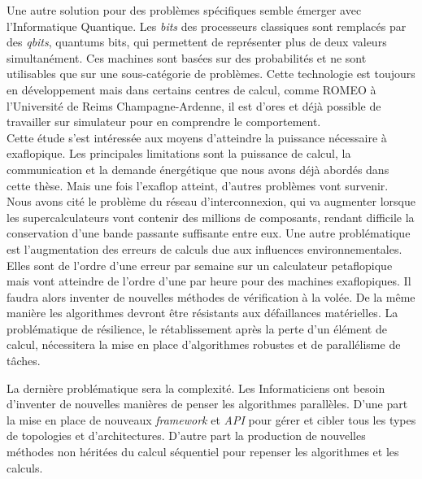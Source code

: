 \documentclass[12pt,a4paper]{report}
\begin{document}
Une autre solution pour des problèmes spécifiques semble émerger avec l'Informatique Quantique. 
Les \textit{bits} des processeurs classiques sont remplacés par des \textit{qbits}, quantums bits, qui permettent de représenter plus de deux valeurs simultanément.  
Ces machines sont basées sur des probabilités et ne sont utilisables que sur une sous-catégorie de problèmes. 
Cette technologie est toujours en développement mais dans certains centres de calcul, comme ROMEO à l'Université de Reims Champagne-Ardenne, il est d’ores et déjà possible de travailler sur simulateur pour en comprendre le comportement.\\

Cette étude s'est intéressée aux moyens d'atteindre la puissance nécessaire à exaflopique.
Les principales limitations sont la puissance de calcul, la communication et la demande énergétique que nous avons déjà abordés dans cette thèse. 
Mais une fois l'exaflop atteint, d'autres problèmes vont survenir. 
Nous avons cité le problème du réseau d'interconnexion, qui va augmenter lorsque les supercalculateurs vont contenir des millions de composants, rendant difficile la conservation d'une bande passante suffisante entre eux.
Une autre problématique est l'augmentation des erreurs de calculs due aux influences environnementales. 
Elles sont de l'ordre d'une erreur par semaine sur un calculateur petaflopique mais vont atteindre de l'ordre d'une par heure pour des machines exaflopiques. 
Il faudra alors inventer de nouvelles méthodes de vérification à la volée. 
De la même manière les algorithmes devront être résistants aux défaillances matérielles. 
La problématique de résilience, le rétablissement après la perte d'un élément de calcul, nécessitera la mise en place d'algorithmes robustes et de parallélisme de tâches. 

La dernière problématique sera la complexité. 
Les Informaticiens ont besoin d'inventer de nouvelles manières de penser les algorithmes parallèles. 
D'une part la mise en place de nouveaux \textit{framework} et \textit{API} pour gérer et cibler tous les types de topologies et d'architectures.
D'autre part la production de nouvelles méthodes non héritées du calcul séquentiel pour repenser les algorithmes et les calculs. 


\renewcommand\bibname{Bibliographie}


\end{document}
